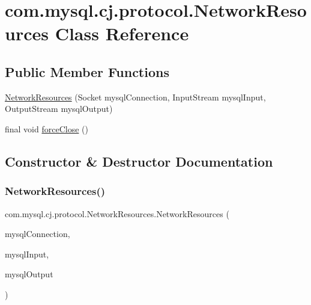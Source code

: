 \hypertarget{classcom_1_1mysql_1_1cj_1_1protocol_1_1_network_resources}{}\section{com.\+mysql.\+cj.\+protocol.\+Network\+Resources Class Reference}
\label{classcom_1_1mysql_1_1cj_1_1protocol_1_1_network_resources}
\subsection*{Public Member Functions}
\begin{DoxyCompactItemize}
\item 
\mbox{\hyperlink{classcom_1_1mysql_1_1cj_1_1protocol_1_1_network_resources_ac38ac7ef65ea97cc46672d9a60184105}{Network\+Resources}} (Socket mysql\+Connection, Input\+Stream mysql\+Input, Output\+Stream mysql\+Output)
\item 
final void \mbox{\hyperlink{classcom_1_1mysql_1_1cj_1_1protocol_1_1_network_resources_a2a216e31a2398da5270533a50142eb40}{force\+Close}} ()
\end{DoxyCompactItemize}


\subsection{Constructor \& Destructor Documentation}
\mbox{\label{classcom_1_1mysql_1_1cj_1_1protocol_1_1_network_resources_ac38ac7ef65ea97cc46672d9a60184105}} 
\subsubsection{\texorpdfstring{Network\+Resources()}{NetworkResources()}}
{\footnotesize\ttfamily com.\+mysql.\+cj.\+protocol.\+Network\+Resources.\+Network\+Resources (\begin{DoxyParamCaption}\item[{Socket}]{mysql\+Connection,  }\item[{Input\+Stream}]{mysql\+Input,  }\item[{Output\+Stream}]{mysql\+Output }\end{DoxyParamCaption})}



